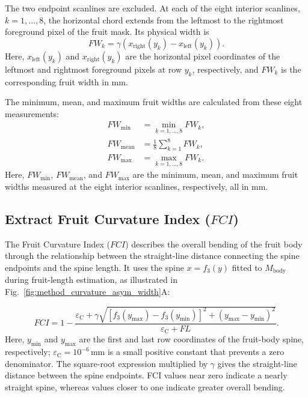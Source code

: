 \documentclass[final,5p,times,twocolumn]{elsarticle}
\begin{document}
The two endpoint scanlines are excluded. At each of the eight interior
scanlines, $k=1,\ldots,8$, the horizontal chord extends from the leftmost
to the rightmost foreground pixel of the fruit mask. Its physical width is
\begin{equation}
    FW_k = \gamma\left(x_{\mathrm{right}}(y_k)
    - x_{\mathrm{left}}(y_k)\right).
\end{equation}
Here, $x_{\mathrm{left}}(y_k)$ and $x_{\mathrm{right}}(y_k)$ are the horizontal pixel coordinates of the leftmost and rightmost foreground pixels at row $y_k$, respectively, and $FW_k$ is the corresponding fruit width in mm.

The minimum, mean, and maximum fruit widths are calculated from these eight
measurements:
\begin{align}
    FW_{\min} &= \min_{k=1,\ldots,8} FW_k, \\
    FW_{\mathrm{mean}} &= \frac{1}{8}\sum_{k=1}^{8} FW_k, \\
    FW_{\max} &= \max_{k=1,\ldots,8} FW_k.
\end{align}
Here, $FW_{\min}$, $FW_{\mathrm{mean}}$, and $FW_{\max}$ are the minimum, mean, and maximum fruit widths measured at the eight interior scanlines, respectively, all in mm.


\subsection*{Extract Fruit Curvature Index ($FCI$)}
The Fruit Curvature Index ($FCI$) describes the overall bending of the fruit body through the relationship between the straight-line distance connecting the spine endpoints and the spine length. It uses the spine $x=f_3(y)$ fitted to $M_{\mathrm{body}}$ during fruit-length estimation, as illustrated in Fig.~\ref{fig:method_curvature_asym_width}A:

\begin{equation}
 FCI=1-\frac{\varepsilon_{\mathrm{C}}+\gamma\sqrt{[f_3(y_{\max})-f_3(y_{\min})]^2+(y_{\max}-y_{\min})^2}}{\varepsilon_{\mathrm{C}}+FL}.
\end{equation}
Here, $y_{\min}$ and $y_{\max}$ are the first and last row coordinates of the fruit-body spine, respectively; $\varepsilon_{\mathrm{C}}=10^{-6}\,\mathrm{mm}$ is a small positive constant that prevents a zero denominator. The square-root expression multiplied by $\gamma$ gives the straight-line distance between the spine endpoints. FCI values near zero indicate a nearly straight spine, whereas values closer to one indicate greater overall bending.
\end{document}
